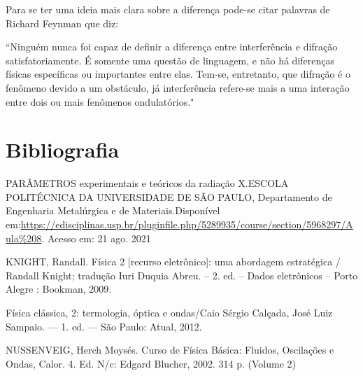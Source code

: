 \documentclass [a4paper, 12pt]{article}
\begin{document}
Para se ter uma ideia mais clara sobre a diferença pode-se citar palavras de Richard Feynman que diz:

“Ninguém nunca foi capaz de definir a diferença entre interferência e difração satisfatoriamente. É somente uma questão de linguagem, e não há diferenças físicas específicas ou importantes entre elas. Tem-se, entretanto, que difração é o fenômeno devido a um obstáculo, já interferência refere-se mais a uma interação entre dois ou mais fenômenos ondulatórios."

\section{Bibliografia}

PARÂMETROS experimentais e teóricos da radiação X.ESCOLA POLITÉCNICA DA UNIVERSIDADE DE SÃO PAULO, Departamento de Engenharia Metalúrgica e de Materiais.Disponível em:\url{https://edisciplinas.usp.br/pluginfile.php/5289935/course/section/5968297/Aula%208}.  Acesso em: 21 ago. 2021

KNIGHT, Randall. Física 2 [recurso eletrônico]: uma abordagem estratégica / Randall Knight; tradução Iuri Duquia Abreu. – 2. ed. – Dados eletrônicos – Porto Alegre : Bookman, 2009.

Física clássica, 2: termologia, óptica e ondas/Caio Sérgio Calçada, José Luiz Sampaio. — 1. ed. — São Paulo: Atual, 2012.

NUSSENVEIG, Herch Moysés. Curso de Física Básica: Fluidos, Oscilações e Ondas, Calor. 4. Ed. N/c: Edgard Blucher, 2002. 314 p. (Volume 2)
\end{document}
